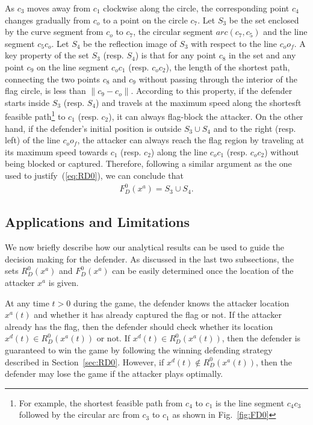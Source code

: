 As $c_3$ moves away from $c_1$ clockwise along the circle, the corresponding point $c_4$ changes gradually from $c_o$ to a point on the circle $c_7$. Let $S_3$ be the set enclosed by the curve segment from $c_o$ to $c_7$, the circular segment $arc(c_7,c_5)$ and the line segment $c_5c_o$. Let $S_4$ be the reflection image of $S_3$ with respect to the line $c_oo_f$. A key property of the set $S_3$ (resp. $S_4$) is that for any point $c_8$ in the set and any point $c_9$ on the line segment $c_oc_1$ (resp. $c_oc_2$), the length of the shortest path, connecting the two points $c_8$ and $c_9$ without passing through the interior of the flag circle, is less than $\|c_9-c_o\|$. According to this property, if the defender starts inside $S_3$ (resp. $S_4$) and travels at the maximum speed along the shortesft feasible path\footnote{For example, the shortest feasible path from $c_4$ to $c_1$ is the line segment $c_4c_3$ followed by the circular arc from $c_3$ to $c_1$ as shown in Fig.~\ref{fig:FD0}} to $c_1$ (resp. $c_2$), it can always flag-block the attacker. On the other hand, if the defender's initial position is outside $S_3\cup S_4$ and to the right (resp. left) of the line $c_oo_f$, the attacker can always reach the flag region by traveling at its maximum speed towards $c_1$ (resp. $c_2$) along the line $c_oc_1$ (resp. $c_oc_2$) without being blocked or captured. Therefore, following a similar argument as the one used to justify~(\ref{eq:RD0}), we can conclude that
\begin{align}
F_D^0(x^a) = S_3 \cup S_4. 
\end{align}

\subsection{Applications and Limitations}
We now briefly describe how our analytical results can be used to guide the decision making for the defender. As discussed in the last two subsections, the sets $R_D^0(x^a)$ and $F_D^0(x^a)$ can be easily determined once the location of the attacker $x^a$ is given.

At any time $t>0$ during the game, the defender knows the attacker location $x^a(t)$ and whether it has already captured the flag or not. If the attacker already has the flag, then the defender should check whether its location $x^d(t)\in R_D^0(x^a(t))$ or not. If $x^d(t)\in R_D^0(x^a(t))$, then the defender is guaranteed to win the game by following the winning defending strategy described in Section~\ref{sec:RD0}. However, if $x^d(t)\notin R_D^0(x^a(t))$, then the defender may lose the game if the attacker plays optimally. 

